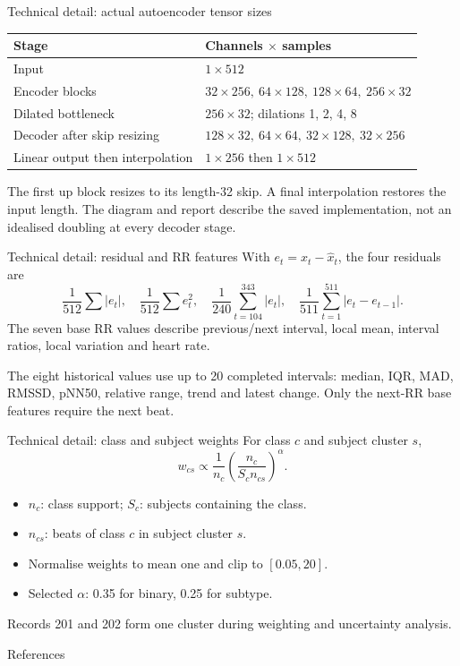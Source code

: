 \documentclass[aspectratio=169,11pt]{beamer}
\begin{document}
\appendix
\begin{frame}{Technical detail: actual autoencoder tensor sizes}
\small
\begin{tabular}{ll}
\toprule
Stage & Channels $\times$ samples\\
\midrule
Input & $1\times512$\\
Encoder blocks & $32\times256,\ 64\times128,\ 128\times64,\ 256\times32$\\
Dilated bottleneck & $256\times32$; dilations 1, 2, 4, 8\\
Decoder after skip resizing & $128\times32,\ 64\times64,\ 32\times128,\ 32\times256$\\
Linear output then interpolation & $1\times256$ then $1\times512$\\
\bottomrule
\end{tabular}
\medskip
The first up block resizes to its length-32 skip. A final interpolation
restores the input length. The diagram and report describe the saved
implementation, not an idealised doubling at every decoder stage.
\end{frame}

\begin{frame}{Technical detail: residual and RR features}
\small
With $e_t=x_t-\hat x_t$, the four residuals are
\[
\frac1{512}\sum|e_t|,\quad \frac1{512}\sum e_t^2,\quad
\frac1{240}\sum_{t=104}^{343}|e_t|,\quad
\frac1{511}\sum_{t=1}^{511}|e_t-e_{t-1}|.
\]
The seven base RR values describe previous/next interval, local mean,
interval ratios, local variation and heart rate.
\medskip

The eight historical values use up to 20 completed intervals: median,
IQR, MAD, RMSSD, pNN50, relative range, trend and latest change.
Only the next-RR base features require the next beat.
\end{frame}

\begin{frame}{Technical detail: class and subject weights}
For class $c$ and subject cluster $s$,
\[
w_{cs}\propto \frac1{n_c}
\left(\frac{n_c}{S_c n_{cs}}\right)^\alpha .
\]
\begin{itemize}
\item $n_c$: class support; $S_c$: subjects containing the class.
\item $n_{cs}$: beats of class $c$ in subject cluster $s$.
\item Normalise weights to mean one and clip to $[0.05,20]$.
\item Selected $\alpha$: 0.35 for binary, 0.25 for subtype.
\end{itemize}
Records 201 and 202 form one cluster during weighting and uncertainty analysis.
\end{frame}

\begin{frame}[allowframebreaks]{References}
\footnotesize


\end{frame}
\end{document}
